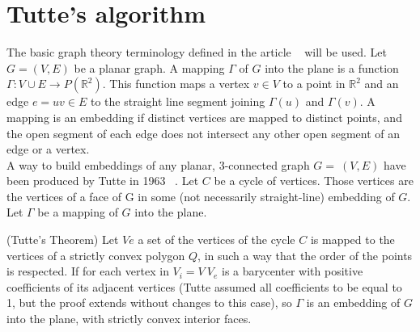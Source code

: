 \section{Tutte's algorithm}


The basic graph theory terminology defined in the article ~\cite{pa, pb}
will be used.  Let $G=(V,E)$ be a planar graph. A mapping $\Gamma$ of $G$
into the plane is a function $\Gamma : V \cup E \to P(\mathbb{R}^2)$. This
function maps a vertex $v \in V$ to a point in $\mathbb{R}^2$ and an edge
$e = uv \in E$ to the straight line segment joining $\Gamma(u)$ and
$\Gamma(v)$.  A mapping is an embedding if distinct vertices are mapped to
distinct points, and the open segment of each edge does not intersect any
other open segment of an edge or a vertex.
\\

A way to build embeddings of any planar, 3-connected graph $G=~(V,E)$ have
been produced by Tutte in 1963 ~\cite{pc}. Let $C$ be a cycle of
vertices. Those vertices are the vertices of a face of G in some (not
necessarily straight-line) embedding of $G$. Let $\Gamma$ be a mapping of
$G$ into the plane.






\begin{theo} \label{theo:box} (Tutte’s Theorem) Let $Ve$ a set of the
  vertices of the cycle $C$ is mapped to the vertices of a strictly convex
  polygon $Q$, in such a way that the order of the points is respected.  If
  for each vertex in $V_i = V \ V_e$ is a barycenter with positive
  coefficients of its adjacent vertices (Tutte assumed all coefficients to
  be equal to 1, but the proof extends without changes to this case), so
  $\Gamma$ is an embedding of $G$ into the plane, with strictly convex
  interior faces.
\end{theo}

